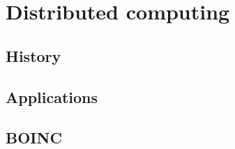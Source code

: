 
\chapter{Distributed computing}
\label{distributed_computing}




\section{History}


\section{Applications}


\section{BOINC}
